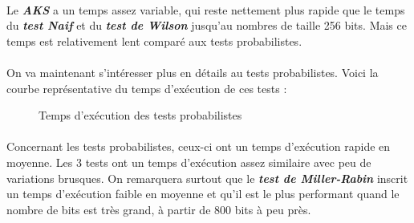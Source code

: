 			\paragraph{} Le \textit{\textbf{AKS}} a un temps assez variable, qui reste nettement plus rapide que le temps du \textit{\textbf{test Naif}} et du \textit{\textbf{test de Wilson}} jusqu'au nombres de taille 256 bits. Mais ce temps est relativement lent comparé aux tests probabilistes.
			
			\paragraph{} On va maintenant s'intéresser plus en détails au tests probabilistes. Voici la courbe représentative du temps d'exécution de ces tests :
			
			\begin{figure}[H]\vspace{-1em}\caption{Temps d'exécution des tests probabilistes}\label{fig:M6}\end{figure}
			
			\paragraph{} Concernant les tests probabilistes, ceux-ci ont un temps d'exécution rapide en moyenne. Les 3 tests ont un temps d'exécution assez similaire avec peu de variations brusques. On remarquera surtout que le \textit{\textbf{test de Miller-Rabin}} inscrit un temps d'exécution faible en moyenne et qu'il est le plus performant quand le nombre de bits est très grand, à partir de 800 bits à peu près.

